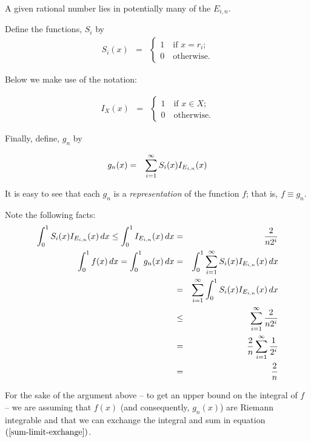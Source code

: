 \documentclass{article}
\begin{document}
A given rational number lies in potentially many of the $E_{i,n}$.

Define the functions, $S_i$ by
\begin{eqnarray}
	S_{i}(x) & = & \begin{cases} 1 \quad \text{if $x = r_i$}; \\ 
	 							  0 \quad \text{otherwise.} 
					\end{cases}
\end{eqnarray}

Below we make use of the notation: 

\begin{eqnarray}
I_X(x) & = & \begin{cases} 1 \quad \text{if $x \in X$}; \\ 0 \quad \text{otherwise.} \end{cases}
\end{eqnarray}

Finally, define, $g_n$ by

\begin{eqnarray}
	g_{n}(x) & = & \sum_{i=1}^\infty\limits S_{i}(x) I_{E_{i,n}}(x)
\end{eqnarray}

It is easy to see that each $g_n$ is a {\em representation\/} of the function $f$; 
that is, $f \equiv g_n$.

Note the following facts:
\begin{eqnarray}
	\int_0^1 S_{i}(x) I_{E_{i,n}}(x)\, dx \le \int_{0}^1 I_{E_{i,n}}(x) \, dx & = & \frac{2}{n2^{i}} \nonumber \\
	\int_0^1 f(x) \, dx = \int_0^1 g_n(x) \, dx & = & \int_0^1 \sum_{i=1}^\infty  S_{i}(x) I_{E_{i,n}}(x)\, dx  \label{sum-limit-exchange} \\
												& = & \sum_{i=1}^\infty \int_0^1   S_{i}(x) I_{E_{i,n}}(x)\, dx \nonumber \\ 
											    & \le & \sum_{i=1}^\infty\limits \frac{2}{n2^{i}}  \nonumber \\ 
											    & =  & \frac{2}{n} \sum_{i=1}^\infty\limits \frac{1}{2^{i}} \nonumber \\
											    & =  & \frac{2}{n} \nonumber
 \end{eqnarray}

For the sake of the argument above -- to get an upper bound on the integral of $f$ -- we are assuming that 
$f(x)$ (and consequently, $g_n(x)$) are Riemann integrable and that we 
can exchange the integral and sum in equation $(\ref{sum-limit-exchange})$.
\end{document}
